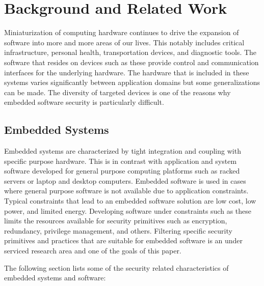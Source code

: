 \documentclass[final,conference,11pt]{IEEEtran}
\begin{document}
\section{Background and Related Work}
Miniaturization of computing hardware continues to drive the expansion of software into more and more areas of our lives.  This notably includes critical infrastructure, personal health, transportation devices, and diagnostic tools.  The software that resides on devices such as these provide control and communication interfaces for the underlying hardware.  The hardware that is included in these systems varies significantly between application domains but some generalizations can be made.  The diversity of targeted devices is one of the reasons why embedded software security is particularly difficult.

\subsection{Embedded Systems}

Embedded systems are characterized by tight integration and coupling with specific purpose hardware.  This is in contrast with application and system software developed for general purpose computing platforms such as racked servers or laptop and desktop computers.  Embedded software is used in cases where general purpose software is not available due to application constraints.  Typical constraints that lead to an embedded software solution are low cost, low power, and limited energy. Developing software under constraints such as these limits the resources available for security primitives such as encryption, redundancy, privilege management, and others.  Filtering specific security primitives and practices that are suitable for embedded software is an under serviced research area and one of the goals of this paper.

The following section lists some of the security related characteristics of embedded systems and software:
\end{document}
